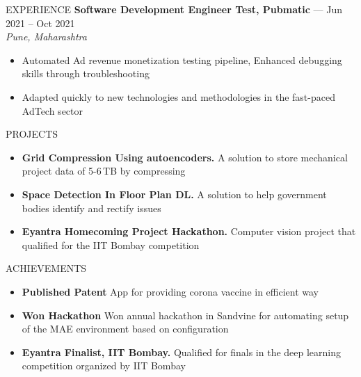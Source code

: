 \documentclass{resume} %
\begin{document}
\begin{rSection}{EXPERIENCE}
\textbf{Software Development Engineer Test, Pubmatic} --- Jun 2021 -- Oct 2021\\
\textit{Pune, Maharashtra}\\
 \begin{itemize}
    \itemsep -6pt 
     \item Automated Ad revenue monetization testing pipeline, Enhanced debugging skills through troubleshooting
    \item Adapted quickly to new technologies and methodologies in the fast-paced AdTech sector
 \end{itemize}
\end{rSection} 


\begin{rSection}{PROJECTS}
\begin{itemize}
\itemsep -6pt
\item \textbf{Grid Compression Using autoencoders.} {A solution to store mechanical project data of 5-6\,TB by compressing}
\item \textbf{Space Detection In Floor Plan DL.} {A solution to help government bodies identify and rectify issues}
\item \textbf{Eyantra Homecoming Project Hackathon.} {Computer vision project that qualified for the IIT Bombay competition}
\end{itemize}
\end{rSection}



\begin{rSection}{ACHIEVEMENTS}
\begin{itemize}
\itemsep -6pt
\item \textbf{Published Patent} {App for providing corona vaccine in efficient way}
\item \textbf{Won Hackathon} {Won annual hackathon in Sandvine for automating setup of the MAE environment based on configuration}
\item \textbf{Eyantra Finalist, IIT Bombay.} {Qualified for finals in the deep learning competition organized by IIT Bombay}
\end{itemize}
\end{rSection}
\end{document}
